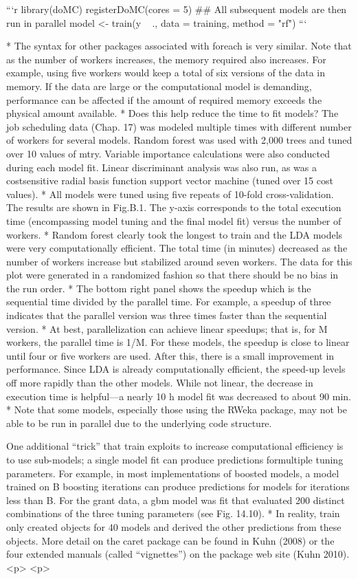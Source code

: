 ```{r}
library(doMC)
registerDoMC(cores = 5)
## All subsequent models are then run in parallel
model <- train(y ~ ., data = training, method = "rf")
```


* The syntax for other packages associated with foreach is very similar. Note
that as the number of workers increases, the memory required also increases.
For example, using five workers would keep a total of six versions of the data
in memory. If the data are large or the computational model is demanding,
performance can be affected if the amount of required memory exceeds the
physical amount available.
* Does this help reduce the time to fit models? The job scheduling data
(Chap. 17) was modeled multiple times with different number of workers for
several models. Random forest was used with 2,000 trees and tuned over 10
values of mtry. Variable importance calculations were also conducted during
each model fit. Linear discriminant analysis was also run, as was a costsensitive
radial basis function support vector machine (tuned over 15 cost
values). 
* All models were tuned using five repeats of 10-fold cross-validation.
The results are shown in Fig.B.1. The y-axis corresponds to the total execution
time (encompassing model tuning and the final model fit) versus the
number of workers. 
* Random forest clearly took the longest to train and the
LDA models were very computationally efficient. The total time (in minutes)
decreased as the number of workers increase but stabilized around seven
workers. The data for this plot were generated in a randomized fashion so
that there should be no bias in the run order. 
* The bottom right panel shows
the speedup which is the sequential time divided by the parallel time. For example,
a speedup of three indicates that the parallel version was three times
faster than the sequential version. 
* At best, parallelization can achieve linear
speedups; that is, for M workers, the parallel time is 1/M. For these models,
the speedup is close to linear until four or five workers are used. After this,
there is a small improvement in performance. Since LDA is already computationally
efficient, the speed-up levels off more rapidly than the other models.
While not linear, the decrease in execution time is helpful—a nearly 10 h
model fit was decreased to about 90 min.
* Note that some models, especially those using the RWeka package, may
not be able to be run in parallel due to the underlying code structure.
\item
One additional “trick” that train exploits to increase computational efficiency
is to use sub-models; a single model fit can produce predictions formultiple tuning parameters. For example, in most implementations of boosted
models, a model trained on B boosting iterations can produce predictions for
models for iterations less than B. For the grant data, a gbm model was fit
that evaluated 200 distinct combinations of the three tuning parameters (see
Fig. 14.10). 
* In reality, train only created objects for 40 models and derived
the other predictions from these objects.
More detail on the caret package can be found in Kuhn (2008) or the four
extended manuals (called “vignettes”) on the package web site (Kuhn 2010).
<p>
<p>
